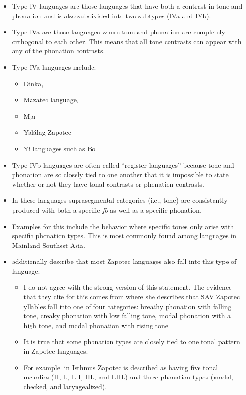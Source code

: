 \begin{itemize}
    \item Type IV languages are those languages that have both a contrast in tone and phonation and is also subdivided into two subtypes (IVa and IVb). 
    \item Type IVa are those languages where tone and phonation are completely orthogonal to each other. This means that all tone contrasts can appear with any of the phonation contrasts. 
    \item Type IVa languages include:
    \begin{itemize}
        \item Dinka,
        \item Mazatec language,
        \item Mpi
        \item Yalálag Zapotec
        \item Yi languages such as Bo
    \end{itemize}
    \item Type IVb languages are often called ``register languages'' because tone and phonation are so closely tied to one another that it is impossible to state whether or not they have tonal contrasts or phonation contrasts. 
    \item In these languages suprasegmental categories (i.e., tone) are consistantly produced with both a specific \textit{f0} as well as a specific phonation. 
    \item Examples for this include the behavior where specific tones only arise with specific phonation types. This is most commonly found among languages in Mainland Southest Asia. 
    \item \citet{espositoCrossLinguisticPatterns2020} additionally describe that most Zapotec languages also fall into this type of language.
    \begin{itemize}
        \item I do not agree with the strong version of this statement. The evidence that they cite for this comes from \citet{espositoVariationContrastivePhonation2010} where she describes that SAV Zapotec yllables fall into one of four categories: breathy phonation with falling tone, creaky phonation with low falling tone, modal phonation with a high tone, and modal phonation with rising tone
        \item It is true that some phonation types are closely tied to one tonal pattern in Zapotec languages. 
        \item For example, in Isthmus Zapotec \citep{pickettIsthmusJuchitanZapotec2010} is described as having five tonal melodies (H, L, LH, HL, and LHL) and three phonation types (modal, checked, and laryngealized). 

\end{itemize}
\end{itemize}
